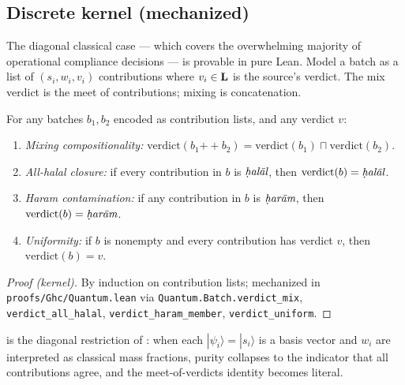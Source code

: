 \subsection{Discrete kernel (mechanized)}

The diagonal classical case --- which covers the overwhelming majority
of operational compliance decisions --- is provable in pure Lean.
Model a batch as a list of $(s_i, w_i, v_i)$ contributions where
$v_i \in \Lat$ is the source's verdict. The mix verdict is the meet of
contributions; mixing is concatenation.

\begin{theorem}
\label{thm:najis-kernel}
For any batches $b_1, b_2$ encoded as contribution lists, and any
verdict $v$:
\begin{enumerate}[label=(N\arabic*)]
  \item \emph{Mixing compositionality:}
        $\mathrm{verdict}(b_1 \mathbin{+\!\!+} b_2) =
         \mathrm{verdict}(b_1) \sqcap \mathrm{verdict}(b_2)$.
  \item \emph{All-halal closure:} if every contribution in $b$ is
        $\halal$, then $\mathrm{verdict}(b) = \halal$.
  \item \emph{Haram contamination:} if any contribution in $b$ is
        $\haram$, then $\mathrm{verdict}(b) = \haram$.
  \item \emph{Uniformity:} if $b$ is nonempty and every contribution
        has verdict $v$, then $\mathrm{verdict}(b) = v$.
\end{enumerate}
\end{theorem}

\begin{proof}[Proof (kernel)]
By induction on contribution lists; mechanized in
\texttt{proofs/Ghc/Quan\-tum.lean} via
\texttt{Quantum.Batch.verdict\_mix}, \texttt{verdict\_all\_halal},
\texttt{verdict\_haram\_member}, \texttt{verdict\_uniform}.
\end{proof}

 is the diagonal restriction of
: when each $|\psi_i\rangle = |s_i\rangle$ is a
basis vector and $w_i$ are interpreted as classical mass fractions,
purity collapses to the indicator that all contributions agree, and
the meet-of-verdicts identity becomes literal.
